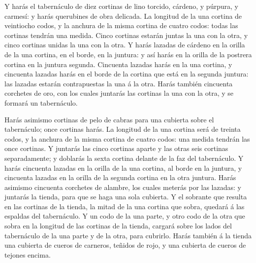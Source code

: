  Y harás el tabernáculo de diez cortinas de lino torcido,
cárdeno, y púrpura, y carmesí: y harás querubines de obra delicada.
 La longitud de la una cortina de veintiocho codos, y la
anchura de la misma cortina de cuatro codos: todas las cortinas tendrán
una medida.  Cinco cortinas estarán juntas la una con la
otra, y cinco cortinas unidas la una con la otra.  Y harás
lazadas de cárdeno en la orilla de la una cortina, en el borde, en la
juntura: y así harás en la orilla de la postrera cortina en la juntura
segunda.  Cincuenta lazadas harás en la una cortina, y
cincuenta lazadas harás en el borde de la cortina que está en la segunda
juntura: las lazadas estarán contrapuestas la una á la otra.
 Harás también cincuenta corchetes de oro, con los cuales
juntarás las cortinas la una con la otra, y se formará un tabernáculo.

 Harás asimismo cortinas de pelo de cabras para una cubierta
sobre el tabernáculo; once cortinas harás.  La longitud de
la una cortina será de treinta codos, y la anchura de la misma cortina
de cuatro codos: una medida tendrán las once cortinas.  Y
juntarás las cinco cortinas aparte y las otras seis cortinas
separadamente; y doblarás la sexta cortina delante de la faz del
tabernáculo.  Y harás cincuenta lazadas en la orilla de la
una cortina, al borde en la juntura, y cincuenta lazadas en la orilla de
la segunda cortina en la otra juntura.  Harás asimismo
cincuenta corchetes de alambre, los cuales meterás por las lazadas: y
juntarás la tienda, para que se haga una sola cubierta.  Y
el sobrante que resulta en las cortinas de la tienda, la mitad de la una
cortina que sobra, quedará á las espaldas del tabernáculo. 
Y un codo de la una parte, y otro codo de la otra que sobra en la
longitud de las cortinas de la tienda, cargará sobre los lados del
tabernáculo de la una parte y de la otra, para cubrirlo. 
Harás también á la tienda una cubierta de cueros de carneros, teñidos de
rojo, y una cubierta de cueros de tejones encima.

